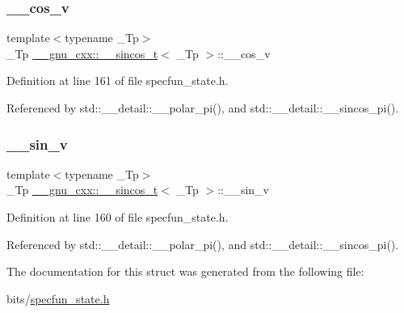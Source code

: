 \subsubsection{\texorpdfstring{\+\_\+\+\_\+cos\+\_\+v}{\_\_cos\_v}}
{\footnotesize\ttfamily template$<$typename \+\_\+\+Tp$>$ \\
\+\_\+\+Tp \hyperlink{struct____gnu__cxx_1_1____sincos__t}{\+\_\+\+\_\+gnu\+\_\+cxx\+::\+\_\+\+\_\+sincos\+\_\+t}$<$ \+\_\+\+Tp $>$\+::\+\_\+\+\_\+cos\+\_\+v}



Definition at line 161 of file specfun\+\_\+state.\+h.



Referenced by std\+::\+\_\+\+\_\+detail\+::\+\_\+\+\_\+polar\+\_\+pi(), and std\+::\+\_\+\+\_\+detail\+::\+\_\+\+\_\+sincos\+\_\+pi().

\mbox{\label{struct____gnu__cxx_1_1____sincos__t_a22a21d9a5658097549cbca39b891fd27}} 
\subsubsection{\texorpdfstring{\+\_\+\+\_\+sin\+\_\+v}{\_\_sin\_v}}
{\footnotesize\ttfamily template$<$typename \+\_\+\+Tp$>$ \\
\+\_\+\+Tp \hyperlink{struct____gnu__cxx_1_1____sincos__t}{\+\_\+\+\_\+gnu\+\_\+cxx\+::\+\_\+\+\_\+sincos\+\_\+t}$<$ \+\_\+\+Tp $>$\+::\+\_\+\+\_\+sin\+\_\+v}



Definition at line 160 of file specfun\+\_\+state.\+h.



Referenced by std\+::\+\_\+\+\_\+detail\+::\+\_\+\+\_\+polar\+\_\+pi(), and std\+::\+\_\+\+\_\+detail\+::\+\_\+\+\_\+sincos\+\_\+pi().



The documentation for this struct was generated from the following file\+:\begin{DoxyCompactItemize}
\item 
bits/\hyperlink{specfun__state_8h}{specfun\+\_\+state.\+h}\end{DoxyCompactItemize}
